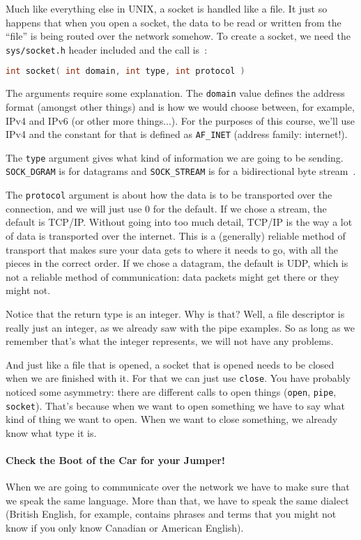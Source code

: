 Much like everything else in UNIX, a socket is handled like a file. It just so happens that when you open a socket, the data to be read or written from the ``file'' is being routed over the network somehow. To create a socket, we need the \texttt{sys/socket.h} header included and the call is~\cite{apunix}:

\begin{lstlisting}[language=C]
int socket( int domain, int type, int protocol )
\end{lstlisting}

The arguments require some explanation. The \texttt{domain} value defines the address format (amongst other things) and is how we would choose between, for example, IPv4 and IPv6 (or other more things...). For the purposes of this course, we'll use IPv4 and the constant for that is defined as \texttt{AF\_INET} (address family: internet!).

The \texttt{type} argument gives what kind of information we are going to be sending. \texttt{SOCK\_DGRAM} is for datagrams and \texttt{SOCK\_STREAM} is for a bidirectional byte stream~\cite{apunix}.

The \texttt{protocol} argument is about how the data is to be transported over the connection, and we will just use 0 for the default. If we chose a stream, the default is TCP/IP. Without going into too much detail, TCP/IP is the way a lot of data is transported over the internet. This is a (generally) reliable method of transport that makes sure your data gets to where it needs to go, with all the pieces in the correct order. If we chose a datagram, the default is UDP, which is not a reliable method of communication: data packets might get there or they might not.

Notice that the return type is an integer. Why is that? Well, a file descriptor is really just an integer, as we already saw with the pipe examples. So as long as we remember that's what the integer represents, we will not have any problems.

And just like a file that is opened, a socket that is opened needs to be closed when we are finished with it. For that we can just use \texttt{close}. You have probably noticed some asymmetry: there are different calls to open things (\texttt{open}, \texttt{pipe}, \texttt{socket}). That's because when we want to open something we have to say what kind of thing we want to open. When we want to close something, we already know what type it is.

\paragraph{Check the Boot of the Car for your Jumper!}
When we are going to communicate over the network we have to make sure that we speak the same language. More than that, we have to speak the same dialect (British English, for example, contains phrases and terms that you might not know if you only know Canadian or American English).

